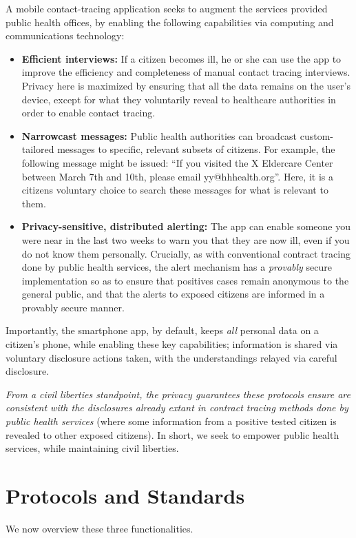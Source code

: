 \documentclass{article}
\begin{document}
A mobile contact-tracing application seeks to augment the services provided public health offices, by enabling the following capabilities via computing and communications technology:

\begin{itemize}
\item \textbf{Efficient interviews:}  If a citizen becomes ill, he or she can use the app to improve the efficiency and completeness of manual contact tracing interviews. Privacy here is maximized by ensuring that all the data remains on the user's device, except for what they voluntarily reveal to healthcare authorities in order to enable contact tracing.

\item \textbf{Narrowcast messages:}  Public health authorities can broadcast
  custom-tailored messages to specific, relevant subsets of citizens.  For example, the following message might be issued: ``If you visited
  the X Eldercare Center between March 7th and 10th, please email yy@hhhealth.org''.  Here, it is a citizens voluntary choice to search these messages for what is relevant to them.
  
\item \textbf{Privacy-sensitive, distributed alerting:}  The app can enable someone you were near in the last two weeks to warn you that they are now ill, even if you do not know them personally.  Crucially, as with conventional contract tracing done by public health services, the alert mechanism has a \emph{provably} secure implementation so as to ensure that positives cases remain anonymous to the general public, and that the alerts to exposed citizens are informed in a provably secure manner.
\end{itemize}

Importantly, the smartphone app, by default, keeps \emph{all} personal data on a citizen's phone, while enabling these key capabilities; information is shared via voluntary disclosure actions taken, with the understandings relayed via careful disclosure. 

\emph{From a civil liberties standpoint, the privacy guarantees these protocols ensure are consistent with the disclosures already extant in contract tracing methods done by public health services} (where some information from a positive tested citizen is revealed to other exposed citizens). In short, we seek to empower public health services, while maintaining civil liberties.
 
\section{Protocols and Standards} 
We now overview these three functionalities.
\end{document}
